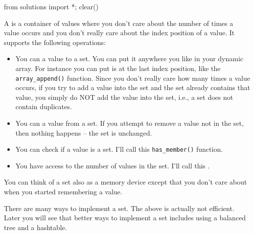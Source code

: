 \begin{python0}
from solutions import *; clear()
\end{python0}

A  is a container of values where you don't care about the number of times a value occurs and you don't really care about the index position of a value. It supports the following operations:

\begin{itemize}
\item
  You can  a value to a set. You can put it anywhere you
  like in your dynamic array. For instance you can put is at the last
  index position, like the \texttt{array\_append()} function. Since you
  don't really care how many times a value occurs, if you try to add a
  value into the set and the set already contains that value, you simply
  do NOT add the value into the set, i.e., a set does not contain
  duplicates.
\item
  You can  a value from a set. If you attempt to remove a
  value not in the set, then nothing happens -- the set is unchanged.
\item
  You can check if a value is  a set. I'll call this
  \texttt{has\_member()} function.
\item
  You have access to the number of values in the set. I'll call this
  .
\end{itemize}

You can think of a set also as a memory device except that you don't care about when you started remembering a value.


There are many ways to implement a set. The above is actually not
efficient. Later you will see that better ways to implement a set
includes using a balanced tree and a hashtable.

